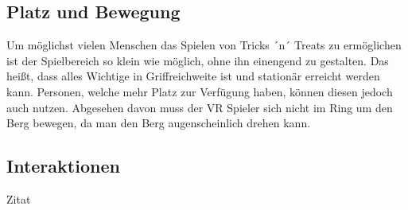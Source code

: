 \subsection{Platz und Bewegung}
Um möglichst vielen Menschen das Spielen von Tricks ´n´ Treats zu ermöglichen ist der Spielbereich so klein wie möglich, ohne ihn einengend zu gestalten. Das heißt, dass alles Wichtige in Griffreichweite ist und stationär erreicht werden kann. Personen, welche mehr Platz zur Verfügung haben, können diesen jedoch auch nutzen. Abgesehen davon muss der VR Spieler sich nicht im Ring um den Berg bewegen, da man den Berg augenscheinlich drehen kann.

\subsection{Interaktionen}
Zitat